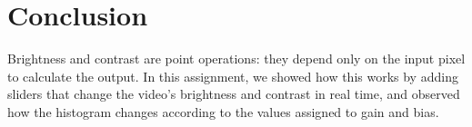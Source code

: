\section{Conclusion}
\label{sec:conclusion}

Brightness and contrast are point operations: they depend only on the input pixel to calculate the output. In this assignment, we showed how this works by adding sliders that change the video's brightness and contrast in real time, and observed how the histogram changes according to the values assigned to gain and bias.

